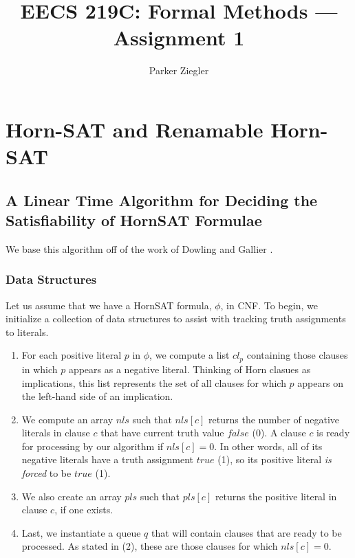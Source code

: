 \documentclass{article}
\title{EECS 219C: Formal Methods — Assignment 1}
\author{Parker Ziegler}
\begin{document}
\maketitle

\section{Horn-SAT and Renamable Horn-SAT}

\bigskip
\subsection{A Linear Time Algorithm for Deciding the Satisfiability of HornSAT Formulae}

\bigskip
\noindent We base this algorithm off of the work of Dowling and Gallier \cite{dowling_1984}.

\subsubsection{Data Structures}

\medskip
\noindent Let us assume that we have a HornSAT formula, $\phi$, in CNF. To begin, we initialize a collection of data structures to assist with tracking truth assignments to literals.

\begin{enumerate}
  \item For each positive literal $p$ in $\phi$, we compute a list $cl_p$ containing those clauses in which $p$ appears as a negative literal. Thinking of Horn clasues as implications, this list represents the set of all clauses for which $p$ appears on the left-hand side of an implication.
  \item We compute an array $nls$ such that $nls[c]$ returns the number of negative literals in clause $c$ that have current truth value $false$ (0). A clause $c$ is ready for processing by our algorithm if $nls[c] = 0$. In other words, all of its negative literals have a truth assignment $true$ (1), so its positive literal \emph{is forced} to be $true$ (1).
  \item We also create an array $pls$ such that $pls[c]$ returns the positive literal in clause $c$, if one exists.
  \item Last, we instantiate a queue $q$ that will contain clauses that are ready to be processed. As stated in (2), these are those clauses for which $nls[c] = 0$.
\end{enumerate}
\end{document}
